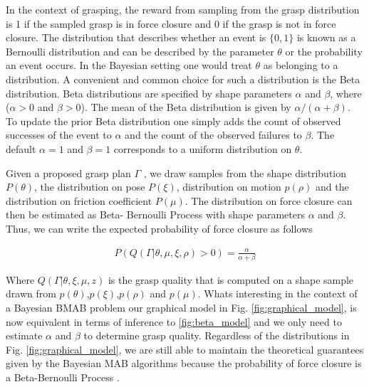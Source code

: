 \documentclass[journal,transmag]{IEEEtran}%
\begin{document}
In the context of grasping, the reward from sampling from the grasp distribution is 1 if the sampled grasp is in force closure and 0 if the grasp is not in force closure. The distribution that describes whether an event is $\lbrace 0, 1 \rbrace$ is known as a Bernoulli distribution and can be described by the parameter $\theta$ or the probability an event occurs. In the Bayesian setting one would treat $\theta$ as belonging to a distribution. A convenient and common choice for such a distribution is the Beta distribution. Beta distributions are specified by shape parameters $\alpha$ and $\beta$, where ($\alpha >0$ and $\beta >0$). The mean of the Beta distribution is given by $\alpha/(\alpha+\beta)$. To update the prior Beta distribution one simply adds the count of observed successes of the event to $\alpha$ and the count of the observed failures to $\beta$. The default $\alpha =1 $ and $\beta =1$ corresponds to a uniform distribution on $\theta$. 

Given a proposed grasp plan $\Gamma$ , we draw samples from the shape distribution $P (\theta )$, the distribution on pose $P (\xi)$, distribution on motion $p(\rho)$ and the distribution on friction coefficient $P (\mu)$. The distribution on force closure can then be estimated as Beta- Bernoulli Process with shape parameters $\alpha$ and $\beta$. Thus, we can write the expected probability of force closure as follows


\vspace{-2ex}
\begin{align}\label{eq:shape_sampling}
P(Q(\Gamma|\theta,\mu,\xi,\rho) > 0) = \frac{\alpha}{\alpha + \beta}
\end{align}

Where $Q(\Gamma|\theta,\xi,\mu,z)$ is the grasp quality that is computed on a shape sample drawn from $p(\theta)$,$p(\xi)$,$p(\rho)$ and $p(\mu)$. Whats interesting in the context of a Bayesian BMAB problem our  graphical model in Fig. \ref{fig:graphical_model}, is now equivalent in terms of inference to \ref{fig:beta_model} and we only need to estimate $\alpha$ and $\beta$ to determine grasp quality. Regardless of the distributions in Fig. \ref{fig:graphical_model}, we are still able to maintain the theoretical guarantees given by the Bayesian MAB algorithms because the probability of force closure is a Beta-Bernoulli Process \cite{agrawal2011analysis} \cite{kaufmann2012bayesian} \cite{weber1992gittins}.  
\end{document}
